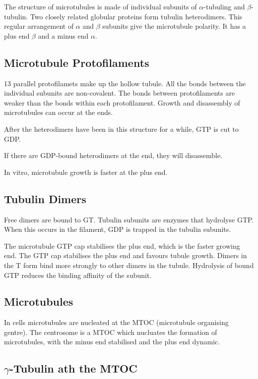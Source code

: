 \documentclass[11pt]{scrartcl}
\begin{document}
The structure of microtubules is made of individual subunits of
$\alpha$-tubuling and $\beta$-tubulin. Two closely related globular
proteins form tubulin heterodimers. This regular arrangement of
$\alpha$ and $\beta$ subunits give the microtubule polarity. It has a
plus end $\beta$ and a minus end $\alpha$.

\subsection{Microtubule Protofilaments}

13 parallel protofilamets make up the hollow tubule. All the bonds
between the individual subunits are non-covalent. The bonds between
protofilaments are weaker than the bonds within each
protofilament. Growth and disassembly of microtubules can occur at the
ends.

After the heterodimers have been in this structure for a while, GTP is cut to GDP.

If there are GDP-bound heterodimers at the end, they will disassemble.

In vitro, microtubule growth is faster at the plus end.

\subsection{Tubulin Dimers}

Free dimers are bound to GT. Tubulin subunits are enzymes that hydrolyse GTP. When this occurs in the filament, GDP is trapped in the tubulin subunits.

The microtubule GTP cap stabilises the plus end, which is the faster growing end. The GTP cap stabilises the plus end and favours tubule growth. Dimers in the T form bind more strongly to other dimers in the tubule. Hydrolysis of bound GTP reduces the binding affinity of the subunit.

\subsection{Microtubules}
In cells microtubules are nucleated at the MTOC (microtubule
organising gentre). The centrosome is a MTOC which nucluates the
formation of microtubules, with the minus end stabilised and the plus
end dynamic.

\subsection{$\gamma$-Tubulin ath the MTOC}
\end{document}
